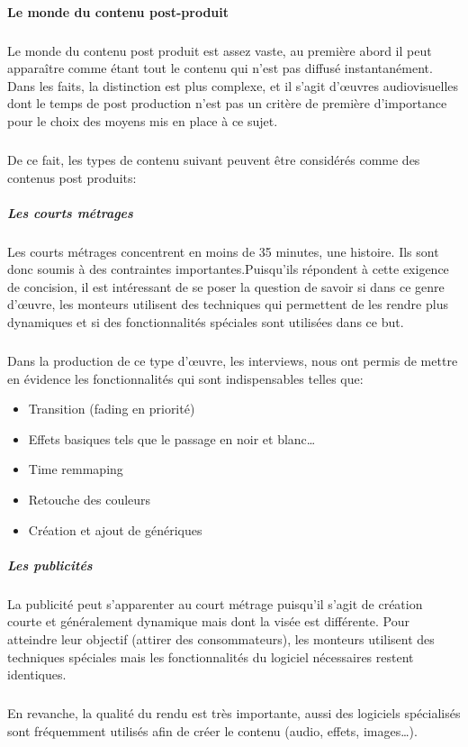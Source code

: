 \paragraph{Le monde du contenu post-produit}
\subparagraph{}
Le monde du contenu post produit est assez vaste, au première abord il peut apparaître comme étant tout le contenu
qui n'est pas diffusé instantanément. Dans les faits, la distinction est plus complexe, et il s'agit
d'œuvres audiovisuelles dont le temps de post production n'est pas un critère de première d'importance
pour le choix des moyens mis en place à ce sujet.

\subparagraph{}
De ce fait, les types de contenu suivant peuvent être considérés comme des contenus post produits:

\subparagraph{Les courts métrages}

\subparagraph{}
Les courts métrages concentrent en moins de 35 minutes, une histoire. Ils sont donc soumis
à des contraintes importantes.Puisqu'ils répondent à cette exigence de concision,
il est intéressant de se poser la question de savoir si dans ce genre
d'œuvre, les monteurs utilisent des techniques qui permettent
de les rendre plus dynamiques et si des fonctionnalités spéciales sont utilisées dans
ce but.

\subparagraph{}
Dans la production de ce type d'œuvre, les interviews, nous ont permis de mettre en évidence
les fonctionnalités qui sont indispensables telles que:
\begin{itemize}
  \item{Transition (fading en priorité)}
  \item{Effets basiques tels que le passage en noir et blanc\ldots}
  \item{Time remmaping}
  \item{Retouche des couleurs}
  \item{Création et ajout de génériques}
\end{itemize}

\subparagraph {Les publicités}
\subparagraph{}
La publicité peut s'apparenter au court métrage puisqu'il s'agit de création
courte et généralement dynamique mais dont la visée est différente. Pour atteindre
leur objectif (attirer des consommateurs), les monteurs utilisent des
techniques spéciales mais les fonctionnalités du logiciel nécessaires restent
identiques.

\subparagraph{}
En revanche, la qualité du rendu est très importante, aussi des logiciels spécialisés
sont fréquemment utilisés afin de créer le contenu (audio, effets, images\ldots).

